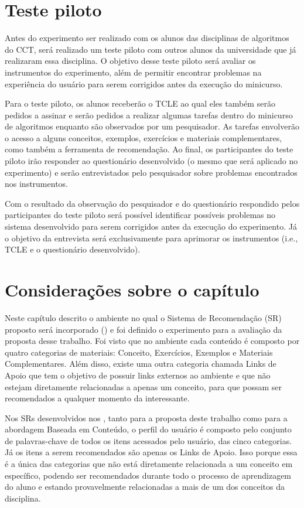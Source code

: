 \section{Teste piloto}

Antes do experimento ser realizado com os alunos das disciplinas de algoritmos do CCT, será realizado um teste piloto com
outros alunos da universidade que já realizaram essa disciplina. O objetivo desse teste piloto será avaliar os
instrumentos do experimento, além de permitir encontrar problemas na experiência do  usuário para serem corrigidos
antes da execução do minicurso.

Para o teste piloto, os alunos receberão o TCLE ao qual eles também serão pedidos a assinar e serão pedidos a realizar algumas
tarefas dentro do minicurso de algoritmos enquanto são observados por um pesquisador. As tarefas envolverão o acesso a
alguns conceitos, exemplos, exercícios e materiais complementares, como também a ferramenta de recomendação. Ao final, os
participantes do teste piloto irão responder ao questionário desenvolvido (o mesmo que será aplicado no experimento) e
serão entrevistados pelo pesquisador sobre problemas encontrados nos instrumentos.

Com o resultado da observação do pesquisador e do questionário respondido pelos participantes do teste piloto será possível
identificar possíveis problemas no sistema desenvolvido para serem corrigidos antes da execução do experimento. Já o objetivo da
entrevista será exclusivamente para aprimorar os instrumentos (i.e., TCLE e o questionário desenvolvido).

\section{Considerações sobre o capítulo}

Neste capítulo descrito o ambiente no qual o Sistema de Recomendação (SR) proposto será incorporado (\adaptweb) e foi definido o
experimento para a avaliação da proposta desse trabalho. Foi visto que no ambiente \adaptweb
cada conteúdo é composto por quatro categorias de materiais: Conceito, Exercícios, Exemplos e Materiais Complementares.
Além disso, existe uma outra categoria chamada Links de Apoio que tem o objetivo de possuir links externos ao ambiente e que
não estejam diretamente relacionadas a apenas um conceito, para que possam ser recomendados a qualquer momento da interessante.

Nos SRs desenvolvidos nos \adaptweb, tanto para a proposta deste trabalho como para a abordagem
Baseada em Conteúdo, o perfil do usuário é composto pelo conjunto de palavras-chave de todos os itens acessados pelo usuário, das
cinco categorias. Já os itens a serem recomendados são apenas os Links de Apoio. Isso porque essa é a única das categorias
que não está diretamente relacionada a um conceito em específico, podendo ser recomendados durante todo o processo de
aprendizagem do aluno e estando provavelmente relacionadas a mais de um dos conceitos da disciplina.

